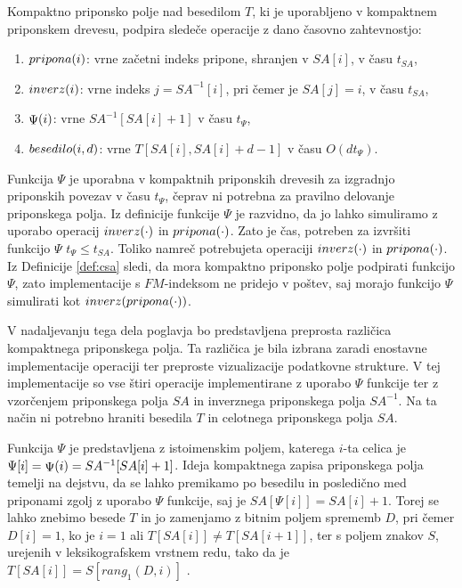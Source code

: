 \begin{defi}\label{def:csa}
     Kompaktno priponsko polje nad besedilom $T$, ki je uporabljeno v kompaktnem priponskem drevesu, podpira sledeče operacije z dano časovno zahtevnostjo:
    \begin{enumerate}
        \item $ \mathop{pripona}(i) $: vrne začetni indeks pripone, shranjen v $SA[i]$, v času $t_{SA}$,
        \item $ \mathop{inverz}(i) $: vrne indeks $j=SA^{-1}[i]$, pri čemer je $SA[j]=i$, v času $t_{SA}$,
        \item $ \mathop{\Psi}(i) $: vrne $SA^{-1}[SA[i]+1]$ v času $t_\Psi$,
        \item $ \mathop{besedilo}(i,d) $: vrne $T[SA[i],SA[i]+d-1]$ v času $O(dt_\Psi)$.
    \end{enumerate}    
\end{defi}

Funkcija $\Psi$ je uporabna v kompaktnih priponskih drevesih za izgradnjo priponskih povezav v času $t_\Psi$, čeprav ni potrebna za pravilno delovanje priponskega polja. Iz definicije funkcije $\Psi$ je razvidno, da jo lahko simuliramo z uporabo operacij $ \mathop{inverz}(\cdot) $ in $ \mathop{pripona}(\cdot) $. Zato je čas, potreben za izvršiti funkcijo $\Psi$ $t_\Psi\le t_{SA}$. Toliko namreč potrebujeta operaciji $ \mathop{inverz}(\cdot) $ in $ \mathop{pripona}(\cdot) $. Iz Definicije \ref{def:csa} sledi, da mora kompaktno priponsko polje podpirati funkcijo $\Psi$, zato implementacije s $FM$-indeksom ne pridejo v poštev, saj morajo funkcijo $\Psi$ simulirati kot $ \mathop{inverz}( \mathop{pripona}(\cdot) ) $.

V nadaljevanju tega dela poglavja bo predstavljena preprosta različica kompaktnega priponskega polja. Ta različica je bila izbrana zaradi enostavne implementacije operaciji ter preproste vizualizacije podatkovne strukture. V tej implementacije so vse štiri operacije implementirane z uporabo $\Psi$ funkcije ter z vzorčenjem priponskega polja $SA$ in inverznega priponskega polja $SA^{-1}$. Na ta način ni potrebno hraniti besedila $T$ in celotnega priponskega polja $SA$.

Funkcija $\Psi$ je predstavljena z istoimenskim poljem, katerega $i$-ta celica je $\Psi[i]= \mathop{\Psi}(i) =SA^{-1}[SA[i]+1]$. Ideja kompaktnega zapisa priponskega polja temelji na dejstvu, da se lahko premikamo po besedilu in posledično med priponami zgolj z uporabo $\Psi$ funkcije, saj je $SA[\Psi[i]]=SA[i]+1$. Torej se lahko znebimo besede $T$ in jo zamenjamo z bitnim poljem sprememb $D$, pri čemer $D[i]=1$, ko je $i=1$ ali $T[SA[i]]\ne T[SA[i+1]]$, ter s poljem znakov $S$, urejenih v leksikografskem vrstnem redu, tako da je $T[SA[i]]=S[rang_1(D,i)]$ \cite{Navarro2016}.

